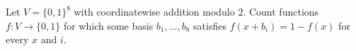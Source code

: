 Let $V=\{0,1\}^8$ with coordinatewise addition modulo $2$. Count functions $f:V\to\{0,1\}$ for which some basis $b_1,\ldots,b_8$ satisfies $f(x+b_i)=1-f(x)$ for every $x$ and $i$.
